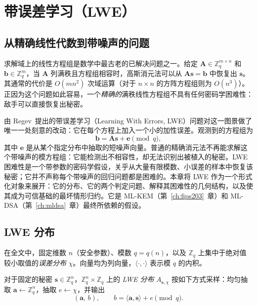 \chapter{带误差学习（LWE）}
\label{ch:lwe}

\section{从精确线性代数到带噪声的问题}

求解域上的线性方程组是数学中最古老的已解决问题之一。给定 $\mathbf{A}\in\mathbb{Z}_q^{m\times n}$ 和 $\mathbf{b}\in\mathbb{Z}_q^{m}$，当 $\mathbf{A}$ 列满秩且方程组相容时，高斯消元法可以从 $\mathbf{A}\mathbf{s}=\mathbf{b}$ 中恢复出 $\mathbf{s}$。其通常的代价是 $O(mn^2)$ 次域运算（对于 $n\times n$ 的方阵方程组则为 $O(n^3)$）。正因为这个问题如此容易，一个\emph{精确的}满秩线性方程组不具有任何密码学困难性：敌手可以直接恢复出秘密。

由 Regev~\cite{regev2009}提出的带误差学习（Learning With Errors, LWE）问题对这一图景做了唯一一处刻意的改动：它在每个方程上加入一个小的加性误差。观测到的方程组为
\[
\mathbf{b} = \mathbf{A}\mathbf{s} + \mathbf{e} \pmod q,
\]
其中 $\mathbf{e}$ 是从某个指定分布中抽取的短噪声向量。普通的精确消元法不再能求解这个带噪声的模方程组：它能检测出不相容性，却无法识别出被植入的秘密。LWE 困难性是一个带参数的密码学假设，关乎从大量有限模数、小误差的样本中恢复该秘密；它并不声称每个带噪声的回归问题都是困难的。本章将 LWE 作为一个形式化对象来展开：它的分布、它的两个判定问题、解释其困难性的几何结构，以及使其成为可信基础的最坏情形归约。它是 ML-KEM（第~\ref{ch:fips203}~章）和 ML-DSA（第~\ref{ch:mldsa}~章）最终所依赖的假设。

\section{LWE 分布}

在全文中，固定维数 $n$（安全参数）、模数 $q=q(n)$，以及 $\mathbb{Z}_q$ 上集中于绝对值较小取值的\emph{误差分布} $\chi$。向量均为列向量，$\langle\cdot,\cdot\rangle$ 表示模 $q$ 的内积。

\begin{definition}[LWE 分布]
对于固定的秘密 $\mathbf{s}\in\mathbb{Z}_q^{n}$，$\mathbb{Z}_q^{n}\times\mathbb{Z}_q$ 上的 \emph{LWE 分布} $A_{\mathbf{s},\chi}$ 按如下方式采样：均匀抽取 $\mathbf{a}\leftarrow\mathbb{Z}_q^{n}$，抽取 $e\leftarrow\chi$，并输出
\[
(\mathbf{a},\,b), \qquad b=\langle \mathbf{a},\mathbf{s}\rangle + e \pmod q.
\]
\end{definition}

